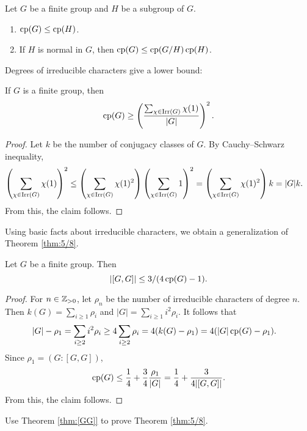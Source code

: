 \begin{exercise}
    Let $G$ be a finite group and $H$ be a subgroup of $G$.
    \begin{enumerate}
        \item $\operatorname{cp}(G)\leq\operatorname{cp}(H)$.
        \item If $H$ is normal in $G$, then $\operatorname{cp}(G)\leq\operatorname{cp}(G/H)\operatorname{cp}(H)$.
    \end{enumerate}
\end{exercise}

Degrees of irreducible characters give a lower bound:

\begin{proposition}
If $G$ is a finite group, then
\[
\operatorname{cp}(G)\geq\left(\frac{\sum_{\chi\in\operatorname{Irr}(G)}\chi(1)}{|G|}\right)^2.
\]
\end{proposition}

\begin{proof}
    Let $k$ be the number of conjugacy classes of $G$.
    By Cauchy--Schwarz inequality, 
    \begin{align*}
        \left(\sum_{\chi\in\operatorname{Irr}(G)}\chi(1)\right)^2
        &\leq\left(\sum_{\chi\in\operatorname{Irr}(G)}\chi(1)^2\right)\left(\sum_{\chi\in\operatorname{Irr}(G)}1\right)^2
        =\left(\sum_{\chi\in\operatorname{Irr}(G)}\chi(1)^2\right)k=|G|k.
    \end{align*}
    From this, the claim follows.
\end{proof}

Using basic facts about irreducible characters, 
we obtain a generalization of Theorem \ref{thm:5/8}. 

\begin{theorem}
\label{thm:[GG]}
    Let $G$ be a finite group. Then
    \[
    |[G,G]|\leq 3/(4\operatorname{cp}(G)-1).
    \]
\end{theorem}

\begin{proof}
    For $n\in\mathbb{Z}_{>0}$, let $\rho_n$ be the number
    of irreducible characters of degree $n$. Then 
    $k(G)=\sum_{i\geq1}\rho_i$ and $|G|=\sum_{i\geq1}i^2\rho_i$. 
    It follows that 
    \begin{align*}
    |G|-\rho_1 &=\sum_{i\geq 2}i^2\rho_i\geq 4\sum_{i\geq2}\rho_i
    =4(k(G)-\rho_1)=4(|G|\operatorname{cp}(G)-\rho_1).
    \end{align*}
    Since $\rho_1=(G:[G,G])$, 
    \[
    \operatorname{cp}(G)\leq \frac14+\frac34\frac{\rho_1}{|G|}=\frac14+\frac3{4|[G,G]|}.
    \]
    From this, the claim follows. 
\end{proof}

\begin{exercise}
    \label{xca:5/8}
    Use Theorem \ref{thm:[GG]} to prove Theorem \ref{thm:5/8}.
\end{exercise}

